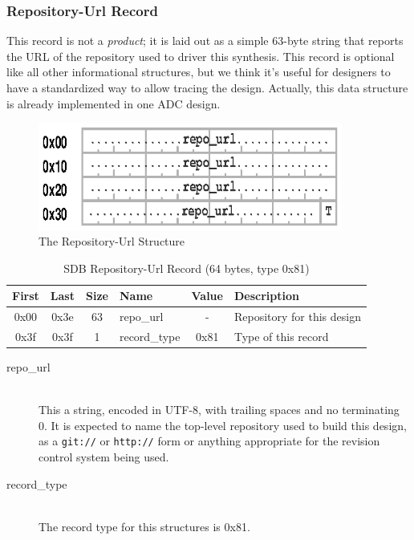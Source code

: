 \documentclass[a4paper, 12pt]{article}
\begin{document}
\pagebreak 

\subsubsection{Repository-Url Record}

This record is not a \textit{product}; it is laid out as a simple 63-byte string
that reports the URL of the repository used to driver this synthesis.
This record is optional like all other informational structures, but we think it's
useful for designers to have a standardized way to allow tracing the design.
Actually, this data structure is already implemented in one ADC design.

\begin{figure}[h]
\centering%
\includegraphics[width=100mm]{img/sdb-url.ps}
\caption{The Repository-Url Structure}
\label{fig:FigureUrl}
\end{figure}

\begin{center}
  \begin{savenotes}
    \begin{table}[!ht]\footnotesize
      \caption{SDB Repository-Url Record (64 bytes, type 0x81)}\label{sdb_url}\centering
        \begin{tabular}{| c | c | c | l | c | p{5cm} |} \hline
        First & Last & Size & Name & Value & Description \\ \hline
        0x00 & 0x3e & 63 & repo\_url & - & Repository for this design \\ \hline
        0x3f & 0x3f & 1 & record\_type & 0x81 & Type of this record \\ \hline
        \end{tabular}
    \end{table}
  \end{savenotes}
\end{center}

\begin{description}
\item[repo\_url] \hfill \\
This a string, encoded in  UTF-8, with trailing spaces and no terminating 0.
It is expected to name the top-level repository
used to build this design, as a \texttt{git://} or \texttt{http://} form or
anything appropriate for the revision control system being used.

\item[record\_type] \hfill \\
The record type for this structures is 0x81.
\end{description}
\end{document}
